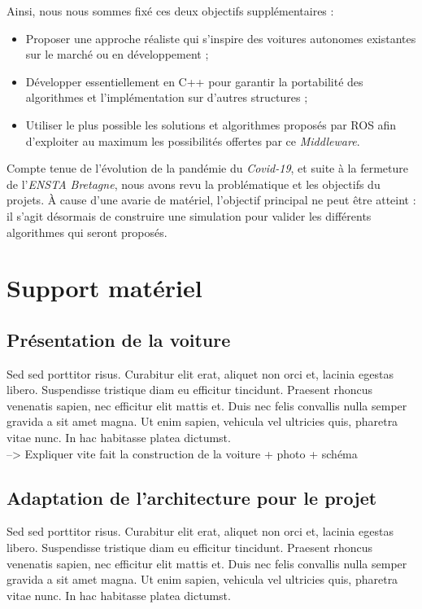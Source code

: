 \documentclass[12pt, openany]{report}
\begin{document}
Ainsi, nous nous sommes fixé ces deux objectifs supplémentaires : 
\begin{itemize}[label=\textbullet, font=\small]
    \item Proposer une approche réaliste qui s'inspire des voitures autonomes existantes sur le marché ou en développement ;
    \item Développer essentiellement en \textsc{C++} pour garantir la portabilité des algorithmes et l'implémentation sur d'autres structures ;\\
    \item Utiliser le plus possible les solutions et algorithmes proposés par \textsc{ROS} afin d'exploiter au maximum les possibilités offertes par ce \textit{Middleware}.\\
\end{itemize}

Compte tenue de l'évolution de la pandémie du \textit{Covid-19}, et suite à la fermeture de l'\textit{ENSTA Bretagne}, nous avons revu la problématique et les objectifs du projets. À cause d'une avarie de matériel, l'objectif principal ne peut être atteint : il s'agit désormais de construire une simulation pour valider les différents algorithmes qui seront proposés.

\section{Support matériel}
\subsection{Présentation de la voiture}
Sed sed porttitor risus. Curabitur elit erat, aliquet non orci et, lacinia egestas libero. Suspendisse tristique diam eu efficitur tincidunt. Praesent rhoncus venenatis sapien, nec efficitur elit mattis et. Duis nec felis convallis nulla semper gravida a sit amet magna. Ut enim sapien, vehicula vel ultricies quis, pharetra vitae nunc. In hac habitasse platea dictumst.\\

--> Expliquer vite fait la construction de la voiture + photo + schéma

\subsection{Adaptation de l'architecture pour le projet}
Sed sed porttitor risus. Curabitur elit erat, aliquet non orci et, lacinia egestas libero. Suspendisse tristique diam eu efficitur tincidunt. Praesent rhoncus venenatis sapien, nec efficitur elit mattis et. Duis nec felis convallis nulla semper gravida a sit amet magna. Ut enim sapien, vehicula vel ultricies quis, pharetra vitae nunc. In hac habitasse platea dictumst.\\
\end{document}
